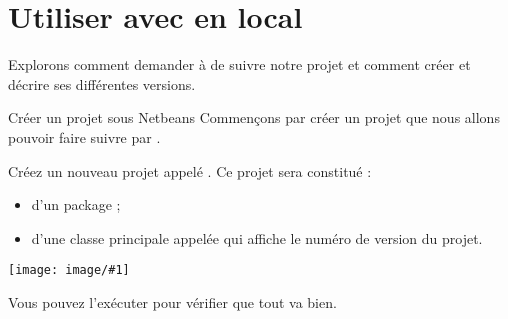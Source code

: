 \documentclass[a4paper,11pt]{style-esi/td}
\newcommand{\image}[2]{{\par\centering \texttt{[image: image/\#1]}\par}
}
\begin{document}

\bigskip
\begin{abstract}
	\noindent
	Un logiciel de gestion de versions comme  permet notamment de :
	\begin{itemize}
	\item 
		gérer l'historique d'un projet en sauvant chaque version
		et la description de ce qu'elle apporte ;
	\item
		sauver le projet (dans toutes ses versions) sur un serveur ;
	\item 
		le retrouver facilement sur une autre machine.
	\end{itemize}
	Le but de ce TD est de vous offrir 
	une introduction à  en utilisant .
	Un TD du laboratoire environnement vous permettra 
	d'apprendre à utiliser  en mode commande
	pour aller plus loin dans sa compréhension et son utilisation.
\end{abstract}

\bigskip
\tableofcontents
\newpage

\section{Utiliser  avec  en local}

Explorons comment demander à  de suivre notre projet 
et comment créer et décrire ses différentes versions.


\begin{Tutoriel}{Créer un projet sous Netbeans}
	Commençons par créer un projet que nous allons pouvoir faire suivre par .
	\begin{steps}
	\item
		Créez un nouveau projet  appelé .
		Ce projet sera constitué  :
		\begin{itemize}
		\item 
			d'un package  ;
		\item
			d'une classe principale appelée 
			qui affiche le numéro de version du projet.
		\end{itemize}
		\image{NetBeans_Project_01}{4cm}
	\item 
		Vous pouvez l'exécuter pour vérifier que tout va bien.
	\end{steps}
\end{Tutoriel}
\end{document}
